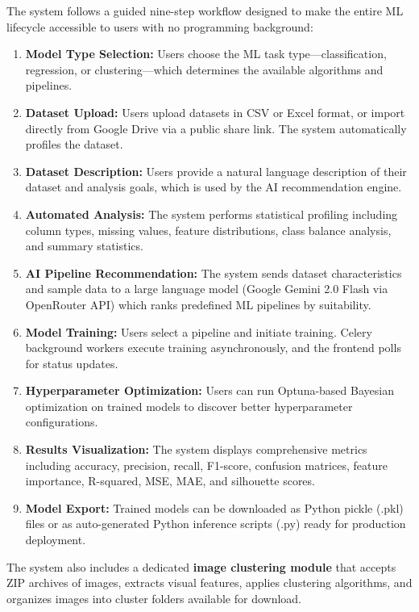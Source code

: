 \documentclass[12pt,a4paper]{report}
\begin{document}
The system follows a guided nine-step workflow designed to make the entire ML lifecycle accessible to users with no programming background:

\begin{enumerate}
    \item \textbf{Model Type Selection:} Users choose the ML task type—classification, regression, or clustering—which determines the available algorithms and pipelines.
    \item \textbf{Dataset Upload:} Users upload datasets in CSV or Excel format, or import directly from Google Drive via a public share link. The system automatically profiles the dataset.
    \item \textbf{Dataset Description:} Users provide a natural language description of their dataset and analysis goals, which is used by the AI recommendation engine.
    \item \textbf{Automated Analysis:} The system performs statistical profiling including column types, missing values, feature distributions, class balance analysis, and summary statistics.
    \item \textbf{AI Pipeline Recommendation:} The system sends dataset characteristics and sample data to a large language model (Google Gemini 2.0 Flash via OpenRouter API) which ranks predefined ML pipelines by suitability.
    \item \textbf{Model Training:} Users select a pipeline and initiate training. Celery background workers execute training asynchronously, and the frontend polls for status updates.
    \item \textbf{Hyperparameter Optimization:} Users can run Optuna-based Bayesian optimization on trained models to discover better hyperparameter configurations.
    \item \textbf{Results Visualization:} The system displays comprehensive metrics including accuracy, precision, recall, F1-score, confusion matrices, feature importance, R-squared, MSE, MAE, and silhouette scores.
    \item \textbf{Model Export:} Trained models can be downloaded as Python pickle (.pkl) files or as auto-generated Python inference scripts (.py) ready for production deployment.
\end{enumerate}

The system also includes a dedicated \textbf{image clustering module} that accepts ZIP archives of images, extracts visual features, applies clustering algorithms, and organizes images into cluster folders available for download.
\end{document}
